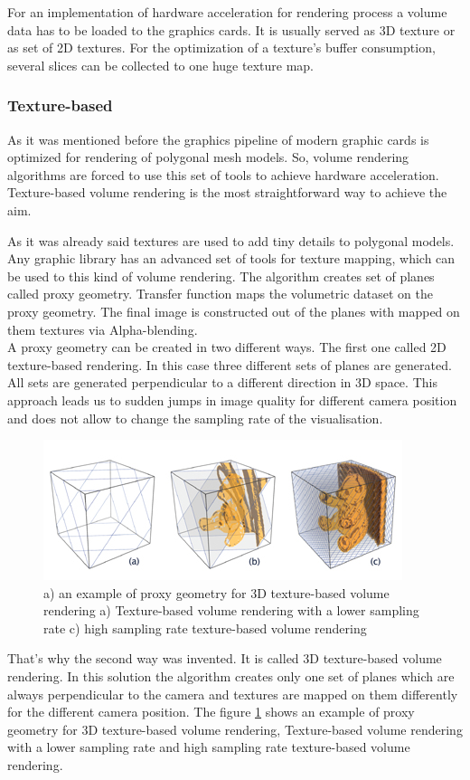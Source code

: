 \documentclass[twoside, english, 11pt]{report}
\begin{document}
For an implementation of hardware acceleration for rendering process a volume data has to be loaded to the graphics cards. It is usually served as 3D texture or as set of 2D textures. For the optimization of a texture's buffer consumption, several slices can be collected to one huge texture map. 
\subsubsection{Texture-based}

As it was mentioned before the graphics pipeline of modern graphic cards is optimized for rendering of polygonal mesh models. So, volume rendering algorithms are forced to use this set of tools to achieve hardware acceleration. Texture-based volume rendering is the most straightforward way to achieve the aim.\

As it was already said textures are used to add tiny details to polygonal models. Any graphic library has an advanced set of tools for texture mapping, which can be used to this kind of volume rendering. The algorithm creates set of planes called proxy geometry. Transfer function maps the volumetric dataset on the proxy geometry. The final image is constructed out of the planes with mapped on them textures via Alpha-blending.\\

A proxy geometry can be created in two different ways. The first one called 2D texture-based rendering. In this case three different sets of planes are generated. All sets are generated perpendicular to a different direction in 3D space. This approach leads us to sudden jumps in image quality for different camera position and does not allow to change the sampling rate of the visualisation.\\
\begin{figure}[!h]
\centerline{
\includegraphics[scale=0.7]{img/texture-based}
}
\caption{a) an example of proxy geometry for 3D texture-based volume rendering a) Texture-based volume rendering with a lower sampling rate c) high sampling rate texture-based volume rendering\label{fig:text}}
\end{figure}
That's why the second way was invented. It is called 3D texture-based volume rendering. In this solution the algorithm creates only one set of planes which are always perpendicular to the camera and textures are mapped on them differently for the different camera position. The figure \ref{fig:text} shows an example of proxy geometry for 3D texture-based volume rendering, Texture-based volume rendering with a lower sampling rate and high sampling rate texture-based volume rendering.\\
\end{document}
